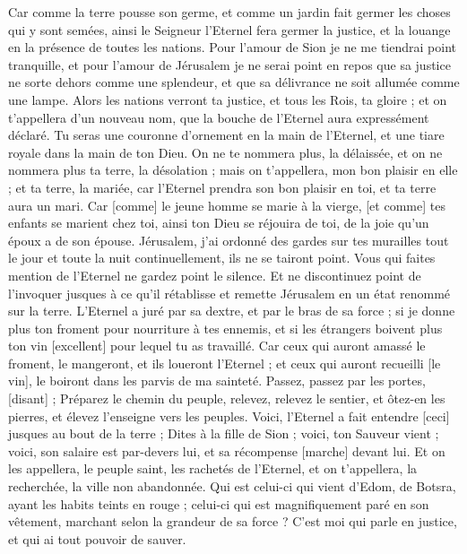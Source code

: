 \begin{multicols}{2}
Car comme la terre pousse son germe, et comme un jardin fait germer les choses qui y sont semées, ainsi le Seigneur l'Eternel fera germer la justice, et la louange en la présence de toutes les nations.
\VerseOne{}Pour l'amour de Sion je ne me tiendrai point tranquille, et pour l'amour de Jérusalem je ne serai point en repos que sa justice ne sorte dehors comme une splendeur, et que sa délivrance ne soit allumée comme une lampe.
Alors les nations verront ta justice, et tous les Rois, ta gloire ; et on t'appellera d'un nouveau nom, que la bouche de l'Eternel aura expressément déclaré.
Tu seras une couronne d'ornement en la main de l'Eternel, et une tiare royale dans la main de ton Dieu.
On ne te nommera plus, la délaissée, et on ne nommera plus ta terre, la désolation ; mais on t'appellera, mon bon plaisir en elle ; et ta terre, la mariée, car l'Eternel prendra son bon plaisir en toi, et ta terre aura un mari.
Car [comme] le jeune homme se marie à la vierge, [et comme] tes enfants se marient chez toi, ainsi ton Dieu se réjouira de toi, de la joie qu'un époux a de son épouse.
Jérusalem, j'ai ordonné des gardes sur tes murailles tout le jour et toute la nuit continuellement, ils ne se tairont point. Vous qui faites mention de l'Eternel ne gardez point le silence.
Et ne discontinuez point de l'invoquer jusques à ce qu'il rétablisse et remette Jérusalem en un état renommé sur la terre.
L'Eternel a juré par sa dextre, et par le bras de sa force ; si je donne plus ton froment pour nourriture à tes ennemis, et si les étrangers boivent plus ton vin [excellent] pour lequel tu as travaillé.
Car ceux qui auront amassé le froment, le mangeront, et ils loueront l'Eternel ; et ceux qui auront recueilli [le vin], le boiront dans les parvis de ma sainteté.
Passez, passez par les portes, [disant] ; Préparez le chemin du peuple, relevez, relevez le sentier, et ôtez-en les pierres, et élevez l'enseigne vers les peuples.
Voici, l'Eternel a fait entendre [ceci] jusques au bout de la terre ; Dites à la fille de Sion ; voici, ton Sauveur vient ; voici, son salaire est par-devers lui, et sa récompense [marche] devant lui.
Et on les appellera, le peuple saint, les rachetés de l'Eternel, et on t'appellera, la recherchée, la ville non abandonnée.
\VerseOne{}Qui est celui-ci qui vient d'Edom, de Botsra, ayant les habits teints en rouge ; celui-ci qui est magnifiquement paré en son vêtement, marchant selon la grandeur de sa force ? C'est moi qui parle en justice, et qui ai tout pouvoir de sauver.

\end{multicols}
